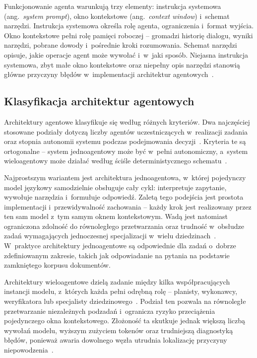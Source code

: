 Funkcjonowanie agenta warunkują trzy elementy: instrukcja systemowa
(ang.~\textit{system prompt}), okno kontekstowe (ang.~\textit{context window})
i~schemat narzędzi. Instrukcja systemowa określa rolę agenta, ograniczenia
i~format wyjścia. Okno kontekstowe pełni rolę pamięci roboczej -- gromadzi
historię dialogu, wyniki narzędzi, pobrane dowody i~pośrednie kroki
rozumowania. Schemat narzędzi opisuje, jakie operacje agent może wywołać
i~w~jaki sposób. Niejasna instrukcja systemowa, zbyt małe okno kontekstowe oraz
niepełny opis narzędzi stanowią główne przyczyny błędów w~implementacji
architektur agentowych~\cite{wang2024survey, schick2023toolformer}.

\subsection{Klasyfikacja architektur agentowych}\label{subsec:klasyfikacja-architektur-agentowych}

Architektury agentowe klasyfikuje się według różnych kryteriów. Dwa najczęściej
stosowane podziały dotyczą liczby agentów uczestniczących w~realizacji zadania
oraz stopnia autonomii systemu podczas podejmowania
decyzji~\cite{wang2024survey, xi2025rise, guo2024large}. Kryteria te są
ortogonalne -- system jednoagentowy może być w~pełni autonomiczny, a~system
wieloagentowy może działać według ściśle deterministycznego 
schematu~\cite{weng2023agent}.

Najprostszym wariantem jest architektura jednoagentowa, w~której pojedynczy
model językowy samodzielnie obsługuje cały cykl: interpretuje zapytanie,
wywołuje narzędzia i~formułuje odpowiedź. Zaletą tego podejścia jest prostota
implementacji i~przewidywalność zachowania -- każdy krok jest realizowany przez
ten sam model z~tym samym oknem kontekstowym. Wadą jest natomiast ograniczona
zdolność do równoległego przetwarzania oraz trudność w~obsłudze zadań
wymagających jednoczesnej specjalizacji w~wielu
dziedzinach~\cite{wang2024survey}. W~praktyce architektury jednoagentowe są
odpowiednie dla zadań o~dobrze zdefiniowanym zakresie, takich jak odpowiadanie
na pytania na podstawie zamkniętego korpusu dokumentów.

Architektury wieloagentowe dzielą zadanie między kilka współpracujących
instancji modelu, z~których każda pełni odrębną rolę -- planisty, wykonawcy,
weryfikatora lub specjalisty dziedzinowego~\cite{guo2024large}. Podział ten
pozwala na równoległe przetwarzanie niezależnych podzadań i~ogranicza ryzyko
przeciążenia pojedynczego okna kontekstowego. Złożoność ta skutkuje jednak
większą liczbą wywołań modelu, wyższym zużyciem tokenów oraz trudniejszą
diagnostyką błędów, ponieważ awaria dowolnego węzła utrudnia lokalizację
przyczyny niepowodzenia~\cite{guo2024large, xi2025rise}.

